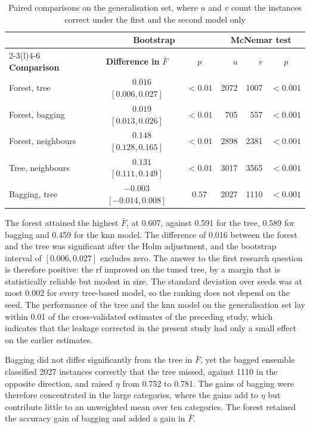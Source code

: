 \begin{table}[!t]
\centering
\caption{Paired comparisons on the generalisation set, where $u$ and $v$ count the instances correct under the first and the second model only}
\label{tab:tests}
\setlength{\tabcolsep}{3pt}
\begin{tabular}{@{}lccrrc@{}}
\toprule
 & \multicolumn{2}{c}{\textbf{Bootstrap}} & \multicolumn{3}{c}{\textbf{McNemar test}} \\
\cmidrule(lr){2-3}\cmidrule(l){4-6}
\textbf{Comparison} & \textbf{Difference in} $\bar{F}$ & $p$ & $u$ & $v$ & $p$ \\
\midrule
Forest, tree       & $\phantom{-}0.016$ $[0.006, 0.027]$   & $<0.01$ & 2072 & 1007 & $<0.001$ \\
Forest, bagging    & $\phantom{-}0.019$ $[0.013, 0.026]$   & $<0.01$ & 705  & 557  & $<0.001$ \\
Forest, neighbours & $\phantom{-}0.148$ $[0.128, 0.165]$   & $<0.01$ & 2898 & 2381 & $<0.001$ \\
Tree, neighbours   & $\phantom{-}0.131$ $[0.111, 0.149]$   & $<0.01$ & 3017 & 3565 & $<0.001$ \\
Bagging, tree      & $-0.003$ $[-0.014, 0.008]$            & $0.57$  & 2027 & 1110 & $<0.001$ \\
\bottomrule
\end{tabular}
\end{table}

The forest attained the highest $\bar{F}$, at 0.607, against 0.591 for the
tree, 0.589 for bagging and 0.459 for the \gls{knn} model. The difference of
0.016 between the forest and the tree was significant after the Holm
adjustment, and the bootstrap interval of $[0.006, 0.027]$ excludes zero.
The answer to the first research question is therefore positive: the
\gls{rf} improved on the tuned tree, by a margin that is statistically
reliable but modest in size. The standard deviation over seeds was at most
0.002 for every tree-based model, so the ranking does not depend on the
seed. The performance of the tree and the \gls{knn} model on the
generalisation set lay within 0.01 of the cross-validated estimates of the
preceding study, which indicates that the leakage corrected in the present
study had only a small effect on the earlier estimates.

Bagging did not differ significantly from the tree in $\bar{F}$, yet the
bagged ensemble classified 2027 instances correctly that the tree missed,
against 1110 in the opposite direction, and raised $\eta$ from 0.752 to
0.781. The gains of bagging were therefore concentrated in the large
categories, where the gains add to $\eta$ but contribute little to an
unweighted mean over ten categories. The forest retained the accuracy gain
of bagging and added a gain in $\bar{F}$.

